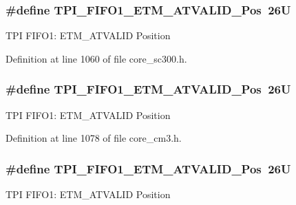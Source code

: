 \subsubsection[{\texorpdfstring{T\+P\+I\+\_\+\+F\+I\+F\+O1\+\_\+\+E\+T\+M\+\_\+\+A\+T\+V\+A\+L\+I\+D\+\_\+\+Pos}{TPI_FIFO1_ETM_ATVALID_Pos}}]{\setlength{\rightskip}{0pt plus 5cm}\#define T\+P\+I\+\_\+\+F\+I\+F\+O1\+\_\+\+E\+T\+M\+\_\+\+A\+T\+V\+A\+L\+I\+D\+\_\+\+Pos~26U}\hypertarget{group___c_m_s_i_s___t_p_i_ga3177b8d815cf4a707a2d3d3d5499315d}{}\label{group___c_m_s_i_s___t_p_i_ga3177b8d815cf4a707a2d3d3d5499315d}
T\+PI F\+I\+F\+O1\+: E\+T\+M\+\_\+\+A\+T\+V\+A\+L\+ID Position 

Definition at line 1060 of file core\+\_\+sc300.\+h.

\subsubsection[{\texorpdfstring{T\+P\+I\+\_\+\+F\+I\+F\+O1\+\_\+\+E\+T\+M\+\_\+\+A\+T\+V\+A\+L\+I\+D\+\_\+\+Pos}{TPI_FIFO1_ETM_ATVALID_Pos}}]{\setlength{\rightskip}{0pt plus 5cm}\#define T\+P\+I\+\_\+\+F\+I\+F\+O1\+\_\+\+E\+T\+M\+\_\+\+A\+T\+V\+A\+L\+I\+D\+\_\+\+Pos~26U}\hypertarget{group___c_m_s_i_s___t_p_i_ga3177b8d815cf4a707a2d3d3d5499315d}{}\label{group___c_m_s_i_s___t_p_i_ga3177b8d815cf4a707a2d3d3d5499315d}
T\+PI F\+I\+F\+O1\+: E\+T\+M\+\_\+\+A\+T\+V\+A\+L\+ID Position 

Definition at line 1078 of file core\+\_\+cm3.\+h.

\subsubsection[{\texorpdfstring{T\+P\+I\+\_\+\+F\+I\+F\+O1\+\_\+\+E\+T\+M\+\_\+\+A\+T\+V\+A\+L\+I\+D\+\_\+\+Pos}{TPI_FIFO1_ETM_ATVALID_Pos}}]{\setlength{\rightskip}{0pt plus 5cm}\#define T\+P\+I\+\_\+\+F\+I\+F\+O1\+\_\+\+E\+T\+M\+\_\+\+A\+T\+V\+A\+L\+I\+D\+\_\+\+Pos~26U}\hypertarget{group___c_m_s_i_s___t_p_i_ga3177b8d815cf4a707a2d3d3d5499315d}{}\label{group___c_m_s_i_s___t_p_i_ga3177b8d815cf4a707a2d3d3d5499315d}
T\+PI F\+I\+F\+O1\+: E\+T\+M\+\_\+\+A\+T\+V\+A\+L\+ID Position 

